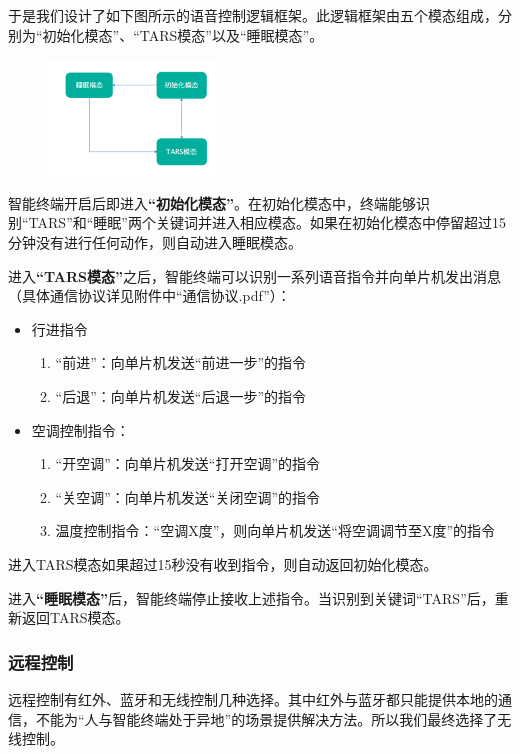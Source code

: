     \hspace{1.5em}于是我们设计了如下图所示的语音控制逻辑框架。此逻辑框架由五个模态组成，分别为“初始化模态”、“TARS模态”以及“睡眠模态”。
    \begin{figure}[H]
        \centering
        \includegraphics[width=0.4\textwidth]{./img/Mode.png}
    \end{figure}
    \hspace{1.5em}智能终端开启后即进入\textbf{“初始化模态”}。在初始化模态中，终端能够识别“TARS”和“睡眠”两个关键词并进入相应模态。如果在初始化模态中停留超过15分钟没有进行任何动作，则自动进入睡眠模态。
    
    \hspace{1.5em}进入\textbf{“TARS模态”}之后，智能终端可以识别一系列语音指令并向单片机发出消息（具体通信协议详见附件中“通信协议.pdf”）：
    \begin{itemize}
        \item 行进指令
        \begin{enumerate}
            \item “前进”：向单片机发送“前进一步”的指令
            \item “后退”：向单片机发送“后退一步”的指令
        \end{enumerate}
        \item 空调控制指令：
        \begin{enumerate}
            \item “开空调”：向单片机发送“打开空调”的指令
            \item “关空调”：向单片机发送“关闭空调”的指令
            \item 温度控制指令：“空调X度”，则向单片机发送“将空调调节至X度”的指令
        \end{enumerate}
    \end{itemize}
    进入TARS模态如果超过15秒没有收到指令，则自动返回初始化模态。

    \hspace{1.5em}进入\textbf{“睡眠模态”}后，智能终端停止接收上述指令。当识别到关键词“TARS”后，重新返回TARS模态。

    \subsubsection{远程控制}
    \hspace{1.5em}远程控制有红外、蓝牙和无线控制几种选择。其中红外与蓝牙都只能提供本地的通信，不能为“人与智能终端处于异地”的场景提供解决方法。所以我们最终选择了无线控制。

